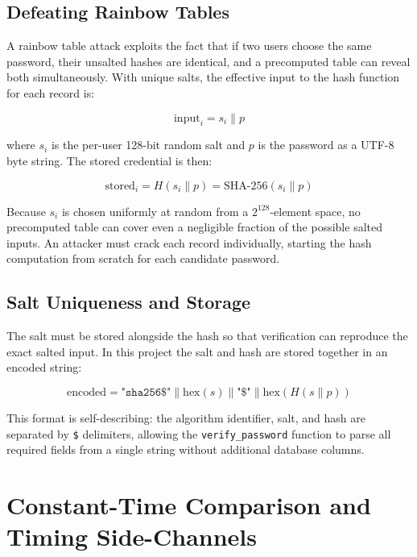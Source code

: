\subsection{Defeating Rainbow Tables}
\label{sec:theory_rainbow}

A rainbow table attack exploits the fact that if two users choose the same password, their unsalted hashes are identical, and a precomputed table can reveal both simultaneously. With unique salts, the effective input to the hash function for each record is:

\begin{equation}
  \text{input}_i = s_i \| p
  \label{eq:salted_input}
\end{equation}

\noindent where $s_i$ is the per-user 128-bit random salt and $p$ is the password as a UTF-8 byte string. The stored credential is then:

\begin{equation}
  \text{stored}_i = H(s_i \| p) = \mathrm{SHA\text{-}256}(s_i \| p)
  \label{eq:salted_hash}
\end{equation}

Because $s_i$ is chosen uniformly at random from a $2^{128}$-element space, no precomputed table can cover even a negligible fraction of the possible salted inputs. An attacker must crack each record individually, starting the hash computation from scratch for each candidate password.

\subsection{Salt Uniqueness and Storage}
\label{sec:theory_salt_storage}

The salt must be stored alongside the hash so that verification can reproduce the exact salted input. In this project the salt and hash are stored together in an encoded string:

\begin{equation}
  \text{encoded} = \texttt{"sha256\$"} \| \mathrm{hex}(s) \| \texttt{"\$"} \| \mathrm{hex}(H(s \| p))
  \label{eq:encoded_format}
\end{equation}

\noindent This format is self-describing: the algorithm identifier, salt, and hash are separated by \texttt{\$} delimiters, allowing the \texttt{verify\_password} function to parse all required fields from a single string without additional database columns.

\section{Constant-Time Comparison and Timing Side-Channels}
\label{sec:theory_timing}


